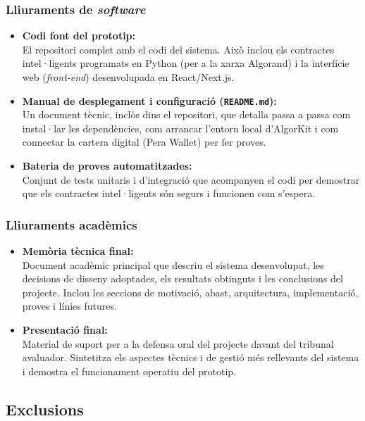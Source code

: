 \subsubsection{Lliuraments de \textit{software}}
\begin{itemize}
    \item \textbf{Codi font del prototip:} \\ El repositori complet amb el codi del sistema. Això inclou els contractes intel·ligents programats en Python (per a la xarxa Algorand) i la interfície web (\textit{front-end}) desenvolupada en React/Next.js.
    \item \textbf{Manual de desplegament i configuració (\texttt{README.md}):} \\ Un document tècnic, inclòs dins el repositori, que detalla passa a passa com instal·lar les dependències, com arrancar l'entorn local d'AlgorKit i com connectar la cartera digital (Pera Wallet) per fer proves.
    \item \textbf{Bateria de proves automatitzades:} \\ Conjunt de tests unitaris i d'integració que acompanyen el codi per demostrar que els contractes intel·ligents són segurs i funcionen com s'espera.
\end{itemize}

\subsubsection{Lliuraments acadèmics}
\begin{itemize}
    \item \textbf{Memòria tècnica final:} \\ Document acadèmic principal que descriu el sistema desenvolupat, les decisions de disseny adoptades, els resultats obtinguts i les conclusions del projecte. Inclou les seccions de motivació, abast, arquitectura, implementació, proves i línies futures.
    
    \item \textbf{Presentació final:} \\ Material de suport per a la defensa oral del projecte davant del tribunal avaluador. Sintetitza els aspectes tècnics i de gestió més rellevants del sistema i demostra el funcionament operatiu del prototip.
\end{itemize}

\subsection{Exclusions}

